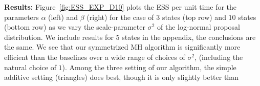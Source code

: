 \noindent \textbf{Results:}
  Figure~\ref{fig:ESS_EXP_D10} plots the ESS per unit time for the parameters 
  $\alpha$ (left) and $\beta$ (right) for the
  case of $3$ states (top row) and $10$ states (bottom row) as we vary the scale-parameter $\sigma^2$ of the
  log-normal proposal distribution. We include results for $5$ states in the 
  appendix, the conclusions are the same. 
We see that our symmetrized MH algorithm is significantly more efficient 
than the baselines over a wide range of choices of $\sigma^2$, 
(including the natural choice of $1$).
Among the three setting of our algorithm, the simple additive setting
 ({triangles}) does best, though it is only slightly better than 
